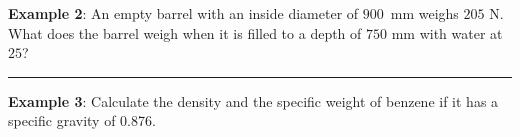 \documentclass[10pt]{amsart}
\begin{document}
\begin{minipage}[t]{0.4\textwidth}
	\raggedright
	\textbf{Example 2}:\parb
	An empty barrel with an inside diameter of $900$~mm weighs $205$ N. \parb
	What does the barrel weigh when it is filled to a depth of $750$ mm
	with water at $25$\textcelsius{}?
	\par\vspace{9cm}
\end{minipage}
%


\rule{\textwidth}{0.02in}
\par
\begin{minipage}[t]{0.45\textwidth}
	\raggedright
	\textbf{Example 3}:\parb
	Calculate the density and the specific weight of benzene if it has a specific gravity of 0.876.
	\par\vspace{6cm}
\end{minipage}
\end{document}
